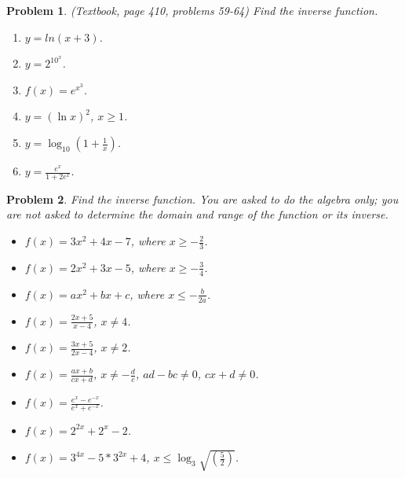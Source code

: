 \documentclass{article}
\newtheorem{problem}{Problem}
\begin{document}
\begin{problem} (Textbook, page 410, problems 59-64)
Find the inverse function. 
\begin{multicols}{2}
\begin{enumerate}
\item $y=ln (x+3)$.
\item $y=2^{10^x}$.
\item $f(x)=e^{x^3}$.
\item $y=(\ln x)^2$, $x\geq 1$.
\item $y=\log_{10}\left(1+\frac{1}{x} \right)$.
\item $y=\frac{e^x}{1+2e^x}$.
\end{enumerate}
\end{multicols}
\end{problem}
\begin{problem}
Find the inverse function. You are asked to do the algebra only; you are not asked to determine the domain and range of the function or its inverse. 
\begin{multicols}{2}
\begin{itemize}
\item $f(x)= 3x^2+4x-7$, where $x\geq -\frac{2}{3}$.
\item $f(x)= 2x^2+3x-5$, where $x\geq -\frac{3}{4}$.
\item $f(x)=ax^2+bx+c$, where $x\leq -\frac{b}{2a}$.
\item $f(x)= \frac{2x+5}{x-4}$, $x\neq 4$.
\item $f(x)= \frac{3x+5}{2x-4}$, $x\neq 2$.
\item $f(x)=\frac{ax+b}{cx+d}$, $x\neq -\frac{d}c$, $ad-bc\neq 0$, $cx+d\neq 0$.
\item $f(x)=\frac{e^x- e^{-x}}{e^x+e^{-x}}$.
\item $f(x)=2^{2x}+2^{x}-2$.
\item $f(x)=3^{4x}- 5* 3^{2x}+4$, $x\leq \log_{3}\sqrt{\left(\frac{5}{2}\right)}$.
\end{itemize}
\end{multicols}
\end{problem}
\end{document}
